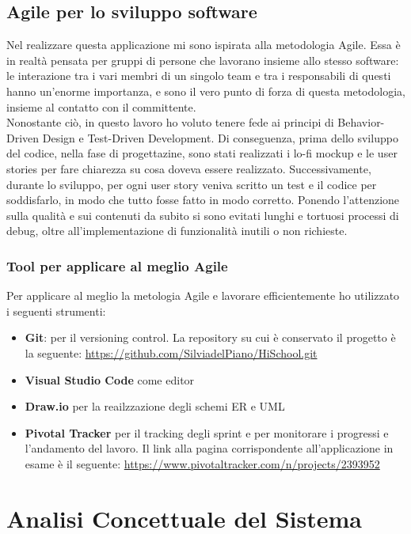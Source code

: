 \documentclass[Lau, binding=0.6cm, oneside]{sapthesis}
\begin{document}
\section{Agile per lo sviluppo software}

Nel realizzare questa applicazione mi sono ispirata alla metodologia Agile. Essa è in realtà pensata per gruppi di persone che lavorano insieme allo stesso software: le interazione tra i vari membri di un singolo team e tra i responsabili di questi hanno un'enorme importanza, e sono il vero punto di forza di questa metodologia, insieme al contatto con il committente.\\
Nonostante ciò, in questo lavoro ho voluto tenere fede ai principi di Behavior-Driven Design e Test-Driven Development. Di conseguenza, prima dello sviluppo del codice, nella fase di progettazine, sono stati realizzati i lo-fi mockup e le user stories per fare chiarezza su cosa doveva essere realizzato. Successivamente, durante lo sviluppo, per ogni user story veniva scritto un test e il codice per soddisfarlo, in modo che tutto fosse fatto in modo corretto. Ponendo l'attenzione sulla qualità e sui contenuti da subito si sono evitati lunghi e tortuosi processi di debug, oltre all'implementazione di funzionalità inutili o non richieste.

\subsection{Tool per applicare al meglio Agile}

Per applicare al meglio la metologia Agile e lavorare efficientemente ho utilizzato i seguenti strumenti:

\begin{itemize}
	\item \textbf{Git}: per il versioning control. La repository su cui è conservato il progetto è la seguente: \url{https://github.com/SilviadelPiano/HiSchool.git}
	\item \textbf{Visual Studio Code} come editor
	\item \textbf{Draw.io} per la reailzzazione degli schemi ER e UML
	\item \textbf{Pivotal Tracker} per il tracking degli sprint e per monitorare i progressi e l'andamento del lavoro. Il link alla pagina corrispondente all'applicazione in esame è il seguente: \url{https://www.pivotaltracker.com/n/projects/2393952}
\end{itemize}

\chapter{Analisi Concettuale del Sistema}
\end{document}
